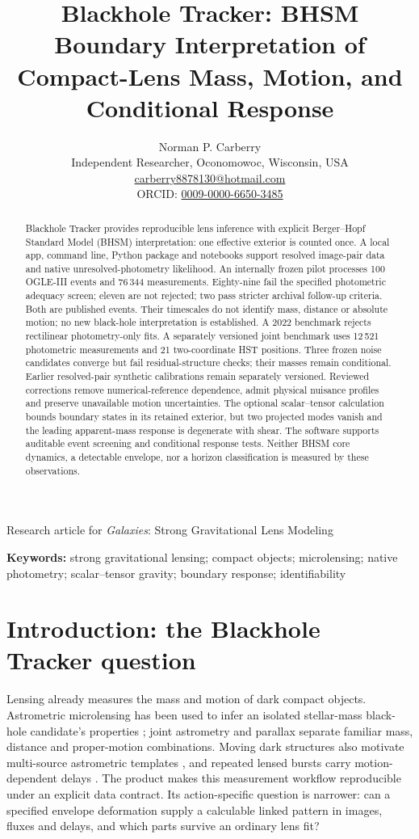 \documentclass[11pt,a4paper]{article}
\title{\textbf{Blackhole Tracker: BHSM Boundary Interpretation of Compact-Lens Mass, Motion, and Conditional Response}}
\author{Norman P. Carberry\\\small Independent Researcher, Oconomowoc, Wisconsin, USA\\
\small \href{mailto:carberry8878130@hotmail.com}{carberry8878130@hotmail.com}\\
\small ORCID: \href{https://orcid.org/0009-0000-6650-3485}{0009-0000-6650-3485}}
\date{}
\begin{document}
\maketitle
\begin{center}\small Research article for \emph{Galaxies}: Strong Gravitational Lens Modeling\end{center}
\begin{abstract}
Blackhole Tracker provides reproducible lens inference with explicit
Berger--Hopf Standard Model (BHSM) interpretation: one effective
exterior is counted once. A local app, command line, Python package and
notebooks support resolved image-pair data and native
unresolved-photometry likelihood. An internally frozen pilot processes
100 OGLE-III events and 76\,344 measurements.
Eighty-nine fail the specified photometric adequacy screen; eleven are
not rejected; two pass stricter archival
follow-up criteria. Both are published events. Their
timescales do not identify mass, distance or absolute motion; no new
black-hole interpretation is established. A 2022
benchmark rejects rectilinear photometry-only fits.
A separately versioned joint benchmark uses 12\,521 photometric measurements
and 21 two-coordinate HST positions. Three frozen noise candidates converge
but fail residual-structure checks; their masses remain conditional.
Earlier resolved-pair synthetic calibrations remain separately versioned. Reviewed corrections
remove numerical-reference dependence, admit physical nuisance profiles
and preserve unavailable motion uncertainties. The optional
scalar--tensor calculation bounds boundary states in its retained exterior,
but two projected modes vanish and the
leading apparent-mass response is degenerate with shear. The software
supports auditable event screening and conditional response tests.
Neither BHSM core dynamics, a detectable envelope, nor a horizon
classification is measured by these observations.
\end{abstract}
\noindent\textbf{Keywords:} strong gravitational lensing; compact objects;
microlensing; native photometry; scalar--tensor gravity; boundary response; identifiability

\section{Introduction: the Blackhole Tracker question}

Lensing already measures the mass and motion of dark compact objects.
Astrometric microlensing has been used to infer an isolated stellar-mass
black-hole candidate's properties \cite{Sahu2022}; joint astrometry and
parallax separate familiar mass, distance and proper-motion combinations.
Moving dark structures also motivate multi-source astrometric templates
\cite{VanTilburg2018}, and repeated lensed bursts carry motion-dependent
delays \cite{Dai2017}. The product makes this measurement workflow reproducible under an explicit
data contract. Its action-specific question is narrower: can a specified
envelope deformation supply a calculable linked pattern in images, fluxes
and delays, and which parts survive an ordinary lens fit?
\end{document}
